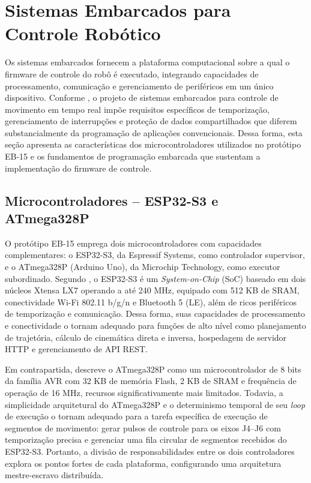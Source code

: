 \section{Sistemas Embarcados para Controle Robótico}

Os sistemas embarcados fornecem a plataforma computacional sobre a qual o firmware de controle do robô é executado, integrando capacidades de processamento, comunicação e gerenciamento de periféricos em um único dispositivo. Conforme , o projeto de sistemas embarcados para controle de movimento em tempo real impõe requisitos específicos de temporização, gerenciamento de interrupções e proteção de dados compartilhados que diferem substancialmente da programação de aplicações convencionais. Dessa forma, esta seção apresenta as características dos microcontroladores utilizados no protótipo EB-15 e os fundamentos de programação embarcada que sustentam a implementação do firmware de controle.

\subsection{Microcontroladores -- ESP32-S3 e ATmega328P}

O protótipo EB-15 emprega dois microcontroladores com capacidades complementares: o ESP32-S3, da Espressif Systems, como controlador supervisor, e o ATmega328P (Arduino Uno), da Microchip Technology, como executor subordinado. Segundo , o ESP32-S3 é um \textit{System-on-Chip} (SoC) baseado em dois núcleos Xtensa LX7 operando a até 240 MHz, equipado com 512 KB de SRAM, conectividade Wi-Fi 802.11 b/g/n e Bluetooth 5 (LE), além de ricos periféricos de temporização e comunicação. Dessa forma, suas capacidades de processamento e conectividade o tornam adequado para funções de alto nível como planejamento de trajetória, cálculo de cinemática direta e inversa, hospedagem de servidor HTTP e gerenciamento de API REST.

Em contrapartida,  descreve o ATmega328P como um microcontrolador de 8 bits da família AVR com 32 KB de memória Flash, 2 KB de SRAM e frequência de operação de 16 MHz, recursos significativamente mais limitados. Todavia, a simplicidade arquitetural do ATmega328P e o determinismo temporal de seu \textit{loop} de execução o tornam adequado para a tarefa específica de execução de segmentos de movimento: gerar pulsos de controle para os eixos J4–J6 com temporização precisa e gerenciar uma fila circular de segmentos recebidos do ESP32-S3. Portanto, a divisão de responsabilidades entre os dois controladores explora os pontos fortes de cada plataforma, configurando uma arquitetura mestre-escravo distribuída.

